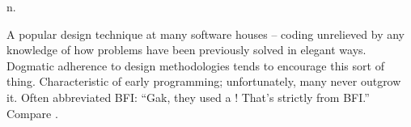  n.

A popular design technique at many software houses -- 
coding unrelieved by any knowledge of how problems have been previously solved
in elegant ways. Dogmatic adherence to design methodologies tends to encourage
this sort of thing. Characteristic of early 
programming; unfortunately, many never outgrow it. Often abbreviated BFI: ``Gak,
they used a ! That's strictly from BFI.'' Compare
.

